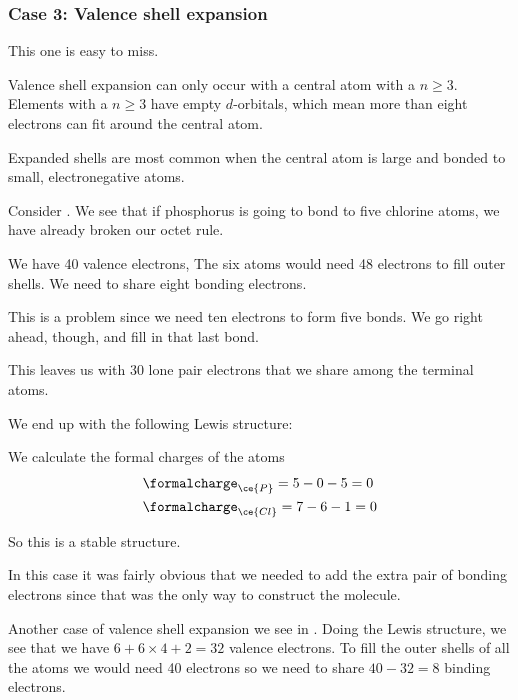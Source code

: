 \documentclass[../mit-general-chemistry.tex]{subfiles}
\begin{document}
\subsubsection{Case 3: Valence shell expansion}

This one is easy to miss.

Valence shell expansion can only occur with a central atom with a $n
\geq 3$. Elements with a $n \geq 3$ have empty $d$-orbitals, which
mean more than eight electrons can fit around the central atom.

Expanded shells are most common when the central atom is large and
bonded to small, electronegative atoms.


Consider . We see that if phosphorus is going to bond to five
chlorine atoms, we have already broken our octet rule.

We have 40 valence electrons, The six atoms would need 48 electrons to
fill outer shells. We need to share eight bonding electrons.

This is a problem since we need ten electrons to form five
 bonds. We go right ahead, though, and fill in that last
bond.

This leaves us with 30 lone pair electrons that we share among the
terminal atoms.

We end up with the following Lewis structure:

\begin{center}
\end{center}

We calculate the formal charges of the atoms
\begin{align*}
  &\formalcharge_{\ce{P}} = 5 - 0 - 5 = 0 \\
  &\formalcharge_{\ce{Cl}} = 7 - 6 - 1 = 0  \\
\end{align*}

So this is a stable structure.

In this case  it was fairly obvious that we needed to add the extra
pair of bonding electrons since that was the only way to construct the
molecule.

Another case of valence shell expansion we see in . Doing
the Lewis structure, we see that we have $6 + 6\times 4 + 2 = 32$ valence
electrons. To fill the outer shells of all the atoms we would need 40
electrons so we need to share $40 -32 = 8$ binding electrons.
\end{document}
